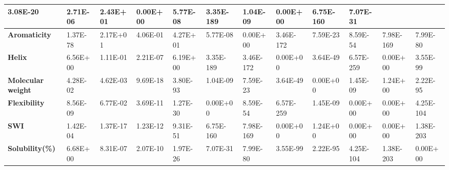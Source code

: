 \begin{table}[h]
{{\begin{tabular}{|l|l|l|l|l|l|l|l|l|l|l|l|}
  3.08E-20 &
  2.71E-06 &
  2.43E+01 &
  0.00E+00 &
  5.77E-08 &
  3.35E-189 &
  1.04E-09 &
  0.00E+00 &
  6.75E-160 &
  7.07E-31 \\ \hline
\textbf{Aromaticity} &
  1.37E-78 &
  2.17E+01 &
  4.06E-01 &
  4.27E+01 &
  5.77E-08 &
  0.00E+00 &
  3.46E-172 &
  7.59E-23 &
  8.59E-54 &
  7.98E-169 &
  7.99E-80 \\ \hline
\textbf{Helix} &
  6.56E+00 &
  1.11E-01 &
  2.21E-07 &
  6.19E+00 &
  3.35E-189 &
  3.46E-172 &
  0.00E+00 &
  3.64E-49 &
  6.57E-259 &
  0.00E+00 &
  3.55E-99 \\ \hline
\textbf{Molecular weight} &
  4.28E-02 &
  4.62E-03 &
  9.69E-18 &
  3.80E-93 &
  1.04E-09 &
  7.59E-23 &
  3.64E-49 &
  0.00E+00 &
  1.45E-09 &
  1.24E+00 &
  2.22E-95 \\ \hline
\textbf{Flexibility} &
  8.56E-09 &
  6.77E-02 &
  3.69E-11 &
  1.27E-30 &
  0.00E+00 &
  8.59E-54 &
  6.57E-259 &
  1.45E-09 &
  0.00E+00 &
  0.00E+00 &
  4.25E-104 \\ \hline
\textbf{SWI} &
  1.42E-04 &
  1.37E-17 &
  1.23E-12 &
  9.31E-51 &
  6.75E-160 &
  7.98E-169 &
  0.00E+00 &
  1.24E+00 &
  0.00E+00 &
  0.00E+00 &
  1.38E-203 \\ \hline
\textbf{Solubility(\%)} &
  6.68E+00 &
  8.31E-07 &
  2.07E-10 &
  1.97E-26 &
  7.07E-31 &
  7.99E-80 &
  3.55E-99 &
  2.22E-95 &
  4.25E-104 &
  1.38E-203 &
  0.00E+00 \\ \hline
\end{tabular}}}

\label{tab:appendix_sodope_S6}
\end{table}


\begin{table}[h]
\centering
\caption[Runtime of protein solubility prediction tools per sequence.]{Runtime of protein solubility prediction tools per sequence, related to Fig \ref{fig:solubility_04}B}
{}

\label{tab:appendix_sodope_S7}
\end{table}



